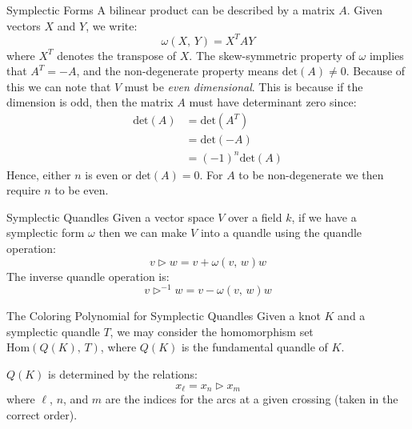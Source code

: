 \documentclass{beamer}
\begin{document}
    \begin{frame}{Symplectic Forms}
        A bilinear product can be described by a matrix $A$. Given vectors
        $X$ and $Y$, we write:
        \[
            \omega(X,\,Y)=X^{T}AY
        \]
        where $X^{T}$ denotes the transpose of $X$. The skew-symmetric property
        of $\omega$ implies that $A^{T}=-A$, and the non-degenerate property
        means $\textrm{det}(A)\ne{0}$. Because of this we can note that
        $V$ must be \textit{even dimensional}. This is because if the dimension
        is odd, then the matrix $A$ must have determinant zero since:
        \[
            \begin{aligned}
                \textrm{det}(A)
                &=\textrm{det}(A^{T})\\
                &=\textrm{det}(-A)\\
                &=(-1)^{n}\textrm{det}(A)
            \end{aligned}
        \]
        Hence, either $n$ is even or $\textrm{det}(A)=0$. For $A$ to be
        non-degenerate we then require $n$ to be even.
    \end{frame}
    \begin{frame}{Symplectic Quandles}
        Given a vector space $V$ over a field $k$, if we have a symplectic
        form $\omega$ then we can make $V$ into a quandle using the quandle
        operation:
        \begin{equation}
            v\triangleright{w}
            =v+\omega(v,\,w)w
        \end{equation}
        The inverse quandle operation is:
        \begin{equation}
            v\triangleright^{-1}{w}
            =v-\omega(v,\,w)w
        \end{equation}
    \end{frame}
    \begin{frame}{The Coloring Polynomial for Symplectic Quandles}
        Given a knot $K$ and a symplectic quandle $T$, we may consider the
        homomorphism set $\textrm{Hom}(Q(K),\,T)$, where $Q(K)$ is the
        fundamental quandle of $K$.
        \par\hfill\par
        $Q(K)$ is determined by the relations:
        \begin{equation}
            x_{\ell}=x_{n}\triangleright{x}_{m}
        \end{equation}
        where $\ell$, $n$, and $m$ are the indices for the arcs at a given
        crossing (taken in the correct order).
    \end{frame}
\end{document}
